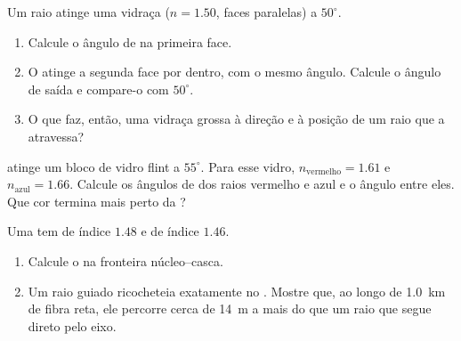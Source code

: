 \begin{exercise}[$\star\star$]\label{exo:g10:refraction:9}
Um raio atinge uma vidraça ($n = 1.50$, faces paralelas) a $50^\circ$.
\begin{enumerate}
  \item Calcule o ângulo de  na primeira face.
  \item O  atinge a segunda face por dentro, com o mesmo
        ângulo. Calcule o ângulo de saída e compare-o com $50^\circ$.
  \item O que faz, então, uma vidraça grossa à direção e à posição de um
        raio que a atravessa?
\end{enumerate}
\end{exercise}

\begin{exercise}[$\star\star$]\label{exo:g10:refraction:10}
 atinge um bloco de vidro flint a $55^\circ$. Para esse vidro,
$n_{\text{vermelho}} = 1.61$ e $n_{\text{azul}} = 1.66$. Calcule os
ângulos de  dos raios vermelho e azul e o ângulo entre eles. Que
cor termina mais perto da ?
\end{exercise}

\begin{exercise}[$\star\star$]\label{exo:g10:refraction:11}
Uma  tem  de índice $1.48$ e  de índice $1.46$.
\begin{enumerate}
  \item Calcule o  na fronteira núcleo--casca.
  \item Um raio guiado ricocheteia exatamente no . Mostre
        que, ao longo de \qty{1.0}{km} de fibra reta, ele percorre cerca
        de \qty{14}{m} a mais do que um raio que segue direto pelo eixo.
\end{enumerate}
\end{exercise}


